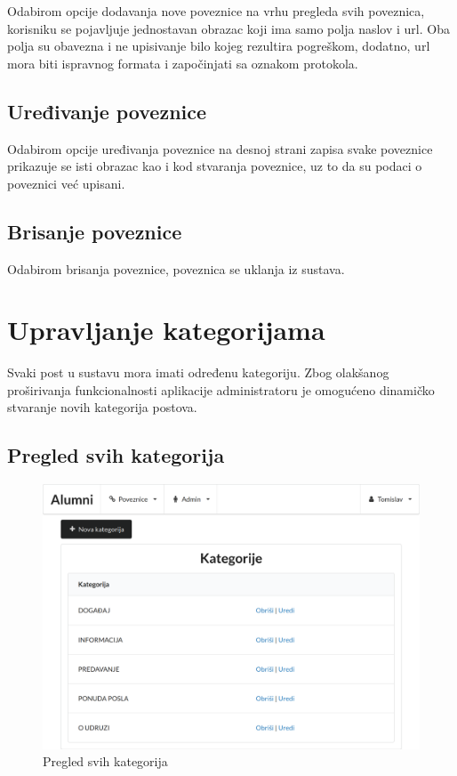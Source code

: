 \documentclass[zavrsni, numeric]{fer}
\begin{document}
Odabirom opcije dodavanja nove poveznice na vrhu pregleda svih poveznica, korisniku se pojavljuje jednostavan obrazac koji ima samo polja naslov i url. Oba polja su obavezna i ne upisivanje bilo kojeg rezultira pogreškom, dodatno, url mora biti ispravnog formata i započinjati sa oznakom protokola.

\subsection{Uređivanje poveznice}
Odabirom opcije uređivanja poveznice na desnoj strani zapisa svake poveznice prikazuje se isti obrazac kao i kod stvaranja poveznice, uz to da su podaci o poveznici već upisani. 

\subsection{Brisanje poveznice}
Odabirom brisanja poveznice, poveznica se uklanja iz sustava.

\section{Upravljanje kategorijama}
Svaki post u sustavu mora imati određenu kategoriju. Zbog olakšanog proširivanja funkcionalnosti aplikacije administratoru je omogućeno dinamičko stvaranje novih kategorija postova. 

\subsection{Pregled svih kategorija}

\begin{figure}[H]
	\centering
	\includegraphics[width=13cm]{slike/kategorije.png}
	\caption{Pregled svih kategorija}
	\label{fig:kategorije}
\end{figure}
\end{document}
